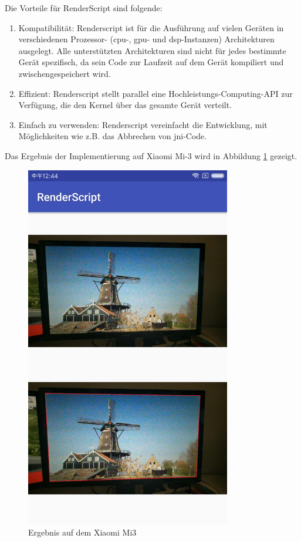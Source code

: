 Die Vorteile für RenderScript sind folgende:
\begin{enumerate}
 \item Kompatibilität: Renderscript ist für die Ausführung auf vielen Geräten in verschiedenen Prozessor- (\gls{cpu}-, \gls{gpu}- und \gls{dsp}-Instanzen) Architekturen ausgelegt. Alle unterstützten Architekturen sind nicht für jedes bestimmte Gerät spezifisch, da sein Code zur Laufzeit auf dem Gerät kompiliert und zwischengespeichert wird.
 \item Effizient: Renderscript stellt parallel eine Hochleistungs-Computing-API zur Verfügung, die den Kernel über das gesamte Gerät verteilt.
 \item Einfach zu verwenden: Renderscript vereinfacht die Entwicklung, mit Möglichkeiten wie z.B. das Abbrechen von \gls{jni}-Code.
\end{enumerate}

Das Ergebnis der Implementierung auf Xiaomi Mi-3 wird in Abbildung \ref{fig:Ergebnis3} gezeigt.

\begin{figure}[H]
 \centering 
  \includegraphics[keepaspectratio,width=0.8\textwidth]{images/5_Implementirung/smartphone.pdf}
 \caption{Ergebnis auf dem Xiaomi Mi3}
 \label{fig:Ergebnis3}
\end{figure}
